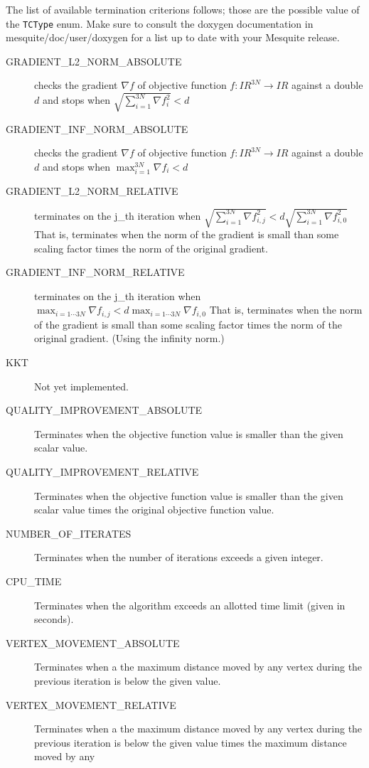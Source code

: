 \documentclass[letter]{report}
\begin{document}
The list of available termination criterions follows; those are the possible value of the
\texttt{TCType} enum. Make sure to consult the doxygen documentation
in mesquite/doc/user/doxygen for a list up to date with your Mesquite release. 
\begin{description}
\item[GRADIENT\_\-L2\_\-NORM\_\-ABSOLUTE] checks the gradient $\nabla f $ of objective function  $f
: I\!\!R^{3N} \rightarrow I\!\!R $ against a double $d$  and stops when $\sqrt{\sum_{i=1}^{3N}\nabla
f_i^2}<d$
\item[GRADIENT\_\-INF\_\-NORM\_\-ABSOLUTE]
checks the gradient $\nabla f $ of objective function  $f : I\!\!R^{3N} \rightarrow I\!\!R $ against
a double $d$  and stops when $ \max_{i=1}^{3N} \nabla f_i < d $ 
\item[GRADIENT\_\-L2\_\-NORM\_\-RELATIVE]terminates on the j\_\-th iteration when
$\sqrt{\sum_{i=1}^{3N}\nabla f_{i,j}^2}<d\sqrt{\sum_{i=1}^{3N}\nabla f_{i,0}^2}$ That is, terminates
when the norm of the gradient is small than some scaling factor times the norm of the original
gradient. 
\item[GRADIENT\_\-INF\_\-NORM\_\-RELATIVE]terminates on the j\_\-th iteration when $\max_{i=1 \cdots
3N}\nabla f_{i,j}<d \max_{i=1 \cdots 3N}\nabla f_{i,0}$ That is, terminates when the norm of the
gradient is small than some scaling factor times the norm of the original gradient. (Using the
infinity norm.) 
\item[KKT] Not yet implemented.
\item[QUALITY\_\-IMPROVEMENT\_\-ABSOLUTE] Terminates when the objective function value is smaller
than the given scalar value.
\item[QUALITY\_\-IMPROVEMENT\_\-RELATIVE] Terminates when the objective function value is smaller
than the given scalar value times the original objective function value. 
\item[NUMBER\_\-OF\_\-ITERATES] Terminates when the number of iterations exceeds a given integer.
\item[CPU\_\-TIME] Terminates when the algorithm exceeds an allotted time limit (given in seconds). 
\item[VERTEX\_\-MOVEMENT\_\-ABSOLUTE] Terminates when a the maximum distance moved by any vertex
during the previous iteration is below the given value. 
\item[VERTEX\_\-MOVEMENT\_\-RELATIVE] Terminates when a the maximum distance moved by any vertex
during the previous iteration is below the given value times the maximum distance moved by any

\end{description}
\end{document}
